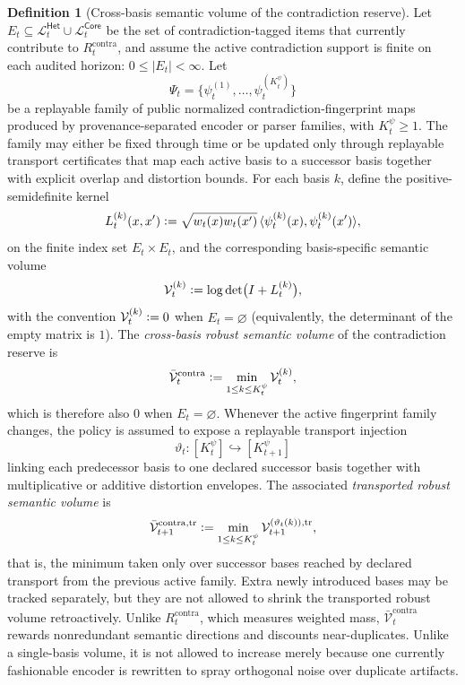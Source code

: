 \documentclass[11pt]{article}
\theoremstyle{definition}
\newtheorem{definition}[theorem]{Definition}
\newcommand{\1}{\mathbf{1}}
\newcommand{\Defeq}{\vcentcolon=}
\newcommand{\Core}{\mathsf{Core}}
\newcommand{\Het}{\mathsf{Het}}
\begin{document}
\begin{definition}[Cross-basis semantic volume of the contradiction reserve]\label{def:semantic_volume}
Let $E_t\subseteq \mathcal L_t^{\Het}\cup\mathcal L_t^{\Core}$ be the set of contradiction-tagged items that currently contribute to $R_t^{\mathrm{contra}}$, and assume the active contradiction support is finite on each audited horizon: $0\le |E_t|<\infty$. Let
\[
\Psi_t=\{\psi_t^{(1)},\dots,\psi_t^{(K_t^{\psi})}\}
\]
be a replayable family of public normalized contradiction-fingerprint maps produced by provenance-separated encoder or parser families, with $K_t^{\psi}\ge 1$. The family may either be fixed through time or be updated only through replayable transport certificates that map each active basis to a successor basis together with explicit overlap and distortion bounds. For each basis $k$, define the positive-semidefinite kernel
\[
L_t^{(k)}(x,x')\Defeq \sqrt{w_t(x)w_t(x')}\,\langle \psi_t^{(k)}(x),\psi_t^{(k)}(x')\rangle,
\]
on the finite index set $E_t\times E_t$, and the corresponding basis-specific semantic volume
\[
\mathcal V_t^{(k)}\Defeq \log\det\bigl(I+L_t^{(k)}\bigr),
\]
with the convention $\mathcal V_t^{(k)}\Defeq 0$ when $E_t=\varnothing$ (equivalently, the determinant of the empty matrix is $1$). The \emph{cross-basis robust semantic volume} of the contradiction reserve is
\[
\bar{\mathcal V}_t^{\mathrm{contra}}\Defeq \min_{1\le k\le K_t^{\psi}} \mathcal V_t^{(k)},
\]
which is therefore also $0$ when $E_t=\varnothing$.
Whenever the active fingerprint family changes, the policy is assumed to expose a replayable transport injection
\[
\vartheta_t:[K_t^{\psi}]\hookrightarrow [K_{t+1}^{\psi}]
\]
linking each predecessor basis to one declared successor basis together with multiplicative or additive distortion envelopes. The associated \emph{transported robust semantic volume} is
\[
\bar{\mathcal V}_{t+1}^{\mathrm{contra},\mathrm{tr}}\Defeq \min_{1\le k\le K_t^{\psi}} \mathcal V_{t+1}^{(\vartheta_t(k)),\mathrm{tr}},
\]
that is, the minimum taken only over successor bases reached by declared transport from the previous active family. Extra newly introduced bases may be tracked separately, but they are not allowed to shrink the transported robust volume retroactively. Unlike $R_t^{\mathrm{contra}}$, which measures weighted mass, $\bar{\mathcal V}_t^{\mathrm{contra}}$ rewards nonredundant semantic directions and discounts near-duplicates. Unlike a single-basis volume, it is not allowed to increase merely because one currently fashionable encoder is rewritten to spray orthogonal noise over duplicate artifacts.
\end{definition}
\end{document}
